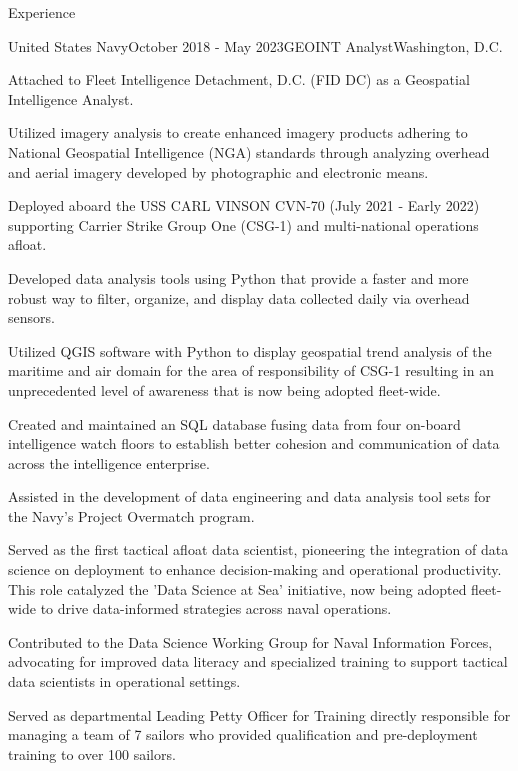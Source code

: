 \documentclass[
	11pt, %
]{resume} %
\begin{document}
\begin{rSection}{Experience}

	\begin{rSubsection}{United States Navy}{October 2018 - May 2023}{GEOINT Analyst}{Washington, D.C.}
		\item Attached to Fleet Intelligence Detachment, D.C. (FID DC) as a Geospatial Intelligence Analyst.
		\item Utilized imagery analysis to create enhanced imagery products adhering to National Geospatial Intelligence (NGA) standards through analyzing overhead and aerial imagery developed by photographic and electronic means.
		\item Deployed aboard the USS CARL VINSON CVN-70 (July 2021 - Early 2022) supporting Carrier Strike Group One (CSG-1) and multi-national operations afloat.
		\item Developed data analysis tools using Python that provide a faster and more robust way to filter, organize, and display data collected daily via overhead sensors.
		\item Utilized QGIS software with Python to display geospatial trend analysis of the maritime and air domain for the area of responsibility of CSG-1 resulting in an unprecedented level of awareness that is now being adopted fleet-wide.
		\item Created and maintained an SQL database fusing data from four on-board intelligence watch floors to establish better cohesion and communication of data across the intelligence enterprise.
		\item Assisted in the development of data engineering and data analysis tool sets for the Navy’s Project Overmatch program.
        \item Served as the first tactical afloat data scientist, pioneering the integration of data science on deployment to enhance decision-making and operational productivity. This role catalyzed the 'Data Science at Sea' initiative, now being adopted fleet-wide to drive data-informed strategies across naval operations.
        \item Contributed to the Data Science Working Group for Naval Information Forces, advocating for improved data literacy and specialized training to support tactical data scientists in operational settings.
		\item Served as departmental Leading Petty Officer for Training directly responsible for managing a team of 7 sailors who provided qualification and pre-deployment training to over 100 sailors.
	\end{rSubsection}



\end{rSection}
\end{document}
